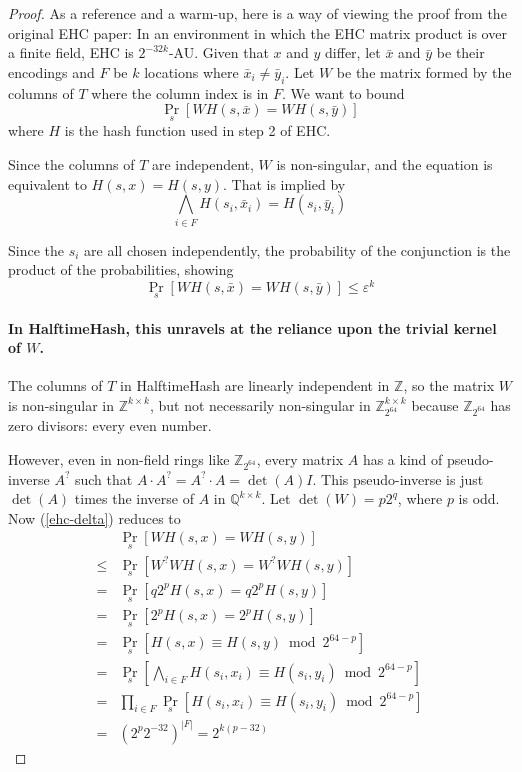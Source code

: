 \documentclass[acmsmall, nonacm]{acmart}
\newcommand{\rats}{\mathbb{Q}}
\newcommand{\ints}{\mathbb{Z}}
\begin{document}
\begin{proof}
As a reference and a warm-up, here is a way of viewing the proof from the original EHC paper:
In an environment in which the EHC matrix product is over a finite field, EHC is $2^{-32k}$-AU.
Given that $x$ and $y$ differ, let $\bar{x}$ and $\bar{y}$ be their encodings and $F$ be $k$ locations where $\bar{x}_i \neq \bar{y}_i$.
Let $W$ be the matrix formed by the columns of $T$ where the column index is in $F$.
We want to bound
\begin{equation}
  \label{ehc-delta}
  \Pr_s[W  H(s,\bar{x}) = W H(s,\bar{y})]
\end{equation}
where $H$ is the hash function used in step 2 of EHC.

Since the columns of $T$ are independent, $W$ is non-singular, and the equation is equivalent to $H(s,x) = H(s,y)$.
That is implied by
\[
\bigwedge_{i \in F} H(s_i, \bar{x}_i) = H(s_i, \bar{y}_i)
\]

Since the $s_i$ are all chosen independently, the probability of the conjunction is the product of the probabilities, showing
\[
\Pr_s[W H(s,\bar{x}) = W H(s,\bar{y})] \leq \varepsilon^k
\]

\paragraph{In HalftimeHash, this unravels at the reliance upon the trivial kernel of $W$.}

The columns of $T$ in HalftimeHash are linearly independent in $\ints$, so the matrix $W$ is non-singular in $\ints^{k\times{}k}$, but not necessarily non-singular in $\ints_{2^{64}}^{k\times{}k}$ because $\ints_{2^{64}}$ has zero divisors: every even number.

However, even in non-field rings like $\ints_{2^{64}}$, every matrix $A$ has a kind of pseudo-inverse $A^?$ such that $A \cdot A^? = A^? \cdot A = \det(A) I$.
This pseudo-inverse is just $\det(A)$ times the inverse of $A$ in $\rats^{k\times{}k}$.
Let $\det(W) = p2^q$, where $p$ is odd.
Now (\ref{ehc-delta}) reduces to
\[
\begin{array}{rl}
  &  \Pr_s[W H(s,x) = W H(s,y)]\\
  \leq & \Pr_s[W^?WH(s,x) = W^?WH(s,y)] \\
  = & \Pr_s[q2^pH(s,x) = q2^pH(s,y)] \\
  = & \Pr_s[2^pH(s,x) = 2^pH(s,y)] \\
  = & \Pr_s[H(s,x) \equiv H(s,y) \bmod 2^{64-p}] \\
  = & \Pr_s\left[\bigwedge_{i \in F} H(s_i,x_i) \equiv H(s_i,y_i) \bmod 2^{64-p}\right] \\
  = & \prod_{i \in F} \Pr_s\left[ H(s_i,x_i) \equiv H(s_i,y_i) \bmod 2^{64-p}\right] \\
  = & \left(2^p 2^{-32}\right)^{|F|} = 2^{k(p-32)}
\end{array}
\]
\end{proof}
\end{document}

